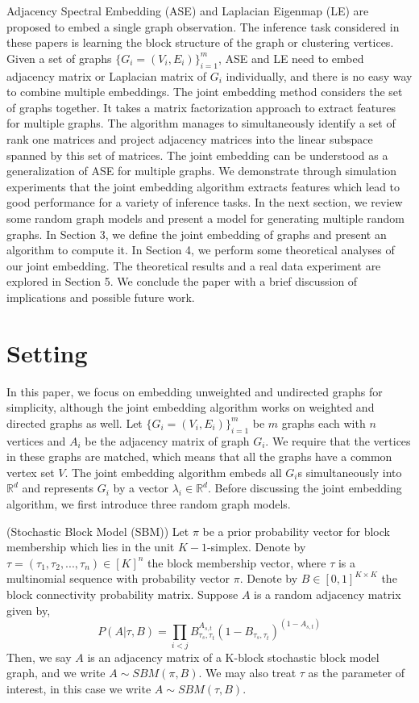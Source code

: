\documentclass[10pt,journal,compsoc]{IEEEtran}
\newenvironment{definition}[1][Definition]{\begin{trivlist}
		\item[\hskip \labelsep {\bfseries #1}]}{\end{trivlist}}
\begin{document}
\noindent Adjacency Spectral Embedding (ASE) and Laplacian Eigenmap (LE) are proposed to embed a single graph observation\cite{sussman2012consistent}\cite{belkin2003laplacian}. The inference task considered in these papers is learning the block structure of the graph or clustering vertices. Given a set of graphs $\{G_i=(V_i,E_i)\} _{i=1}^{m}$, ASE and LE need to embed adjacency matrix or Laplacian matrix of $G_i$ individually, and there is no easy way to combine multiple embeddings. The joint embedding method considers the set of graphs together. It takes a matrix factorization approach to extract features for multiple graphs. The algorithm manages to simultaneously identify a set of rank one matrices and project adjacency matrices into the linear subspace spanned by this set of matrices. The joint embedding can be understood as a generalization of ASE for multiple graphs. We demonstrate through simulation experiments that the joint embedding algorithm extracts features which lead to good performance for a variety of inference tasks. In the next section, we review some random graph models and present a model for generating multiple random graphs. In Section 3, we define the joint embedding of graphs and present an algorithm to compute it. In Section 4, we perform some theoretical analyses of our joint embedding. The theoretical results and a real data experiment are explored in Section 5. We conclude the paper with a brief discussion of implications and possible future work.

\section{Setting}
In this paper, we focus on embedding unweighted and undirected graphs for simplicity, although the joint embedding algorithm works on weighted and directed graphs as well. Let $\{G_i=(V_i,E_i)\} _{i=1}^{m}$ be $m$ graphs each with $n$ vertices and $A_i$ be the adjacency matrix of graph $G_i$. We require that the vertices in these graphs are matched, which means that all the graphs have a common vertex set $V$. The joint embedding algorithm embeds all $G_i$s simultaneously into $\mathbb{R}^d$ and represents $G_i$  by a vector $\lambda_i \in \mathbb{R}^d$. Before discussing the joint embedding algorithm, we first introduce three random graph models.

\begin{definition} (Stochastic Block Model (SBM)) Let $\pi$ be a prior probability vector for block membership which lies in the unit $K-1$-simplex. Denote by $\tau=(\tau_1,\tau_2,...,\tau_n) \in [K]^n$ the block membership vector, where $\tau$ is a multinomial sequence with probability vector $\pi$.
Denote by $B \in [0,1]^{K \times K}$ the block connectivity probability matrix. Suppose $A$ is a random adjacency matrix given by,
\[ P(A|\tau,B)= \prod_{i<j} B_{\tau_s,\tau_t}^{A_{s,t}} (1-B_{\tau_s,\tau_t})^{(1-A_{s,t})}\] 
Then, we say $A$ is an adjacency matrix of a K-block stochastic block model graph, and we write $A \sim SBM(\pi,B)$. We may also treat $\tau$ as the parameter of interest, in this case we write $A \sim SBM(\tau,B)$.
\end{definition}
\end{document}

